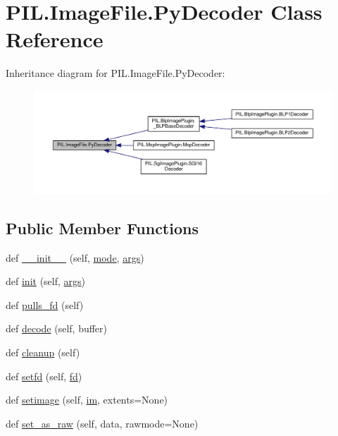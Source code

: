 \hypertarget{classPIL_1_1ImageFile_1_1PyDecoder}{}\section{P\+I\+L.\+Image\+File.\+Py\+Decoder Class Reference}
\label{classPIL_1_1ImageFile_1_1PyDecoder}


Inheritance diagram for P\+I\+L.\+Image\+File.\+Py\+Decoder\+:
\nopagebreak
\begin{figure}[H]
\begin{center}
\leavevmode
\includegraphics[width=350pt]{classPIL_1_1ImageFile_1_1PyDecoder__inherit__graph}
\end{center}
\end{figure}
\subsection*{Public Member Functions}
\begin{DoxyCompactItemize}
\item 
def \hyperlink{classPIL_1_1ImageFile_1_1PyDecoder_ac47fc20d88148418837a135a1ec24296}{\+\_\+\+\_\+init\+\_\+\+\_\+} (self, \hyperlink{classPIL_1_1ImageFile_1_1PyDecoder_a777846369024a113fd2afdaaa93a0a7b}{mode}, \hyperlink{classPIL_1_1ImageFile_1_1PyDecoder_a87bbe9fbb88f4a8150b93462c4242e61}{args})
\item 
def \hyperlink{classPIL_1_1ImageFile_1_1PyDecoder_a73adfa84df7f437649d905615f0bbf66}{init} (self, \hyperlink{classPIL_1_1ImageFile_1_1PyDecoder_a87bbe9fbb88f4a8150b93462c4242e61}{args})
\item 
def \hyperlink{classPIL_1_1ImageFile_1_1PyDecoder_a03e4d24558b2f5a9fd92aabef612d22c}{pulls\+\_\+fd} (self)
\item 
def \hyperlink{classPIL_1_1ImageFile_1_1PyDecoder_a2de3fa244058073809e5f82fb5fc246b}{decode} (self, buffer)
\item 
def \hyperlink{classPIL_1_1ImageFile_1_1PyDecoder_a17d825b7012ec4b6a3ca88f236d6cee2}{cleanup} (self)
\item 
def \hyperlink{classPIL_1_1ImageFile_1_1PyDecoder_aeb90248e85ea28be721bac7f0723c299}{setfd} (self, \hyperlink{classPIL_1_1ImageFile_1_1PyDecoder_a72d92b39bff0da0e60242edce04c37d6}{fd})
\item 
def \hyperlink{classPIL_1_1ImageFile_1_1PyDecoder_a7e53b219c879d8b13ec36c384f10cdbd}{setimage} (self, \hyperlink{classPIL_1_1ImageFile_1_1PyDecoder_a7bfe7771a3780363e5c2ba80d9da95ea}{im}, extents=None)
\item 
def \hyperlink{classPIL_1_1ImageFile_1_1PyDecoder_a74d72fef9fe671a78ca05f8c4ed0838c}{set\+\_\+as\+\_\+raw} (self, data, rawmode=None)
\end{DoxyCompactItemize}
